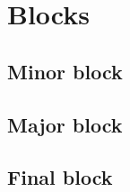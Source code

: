 \documentclass[../hydrozoa.tex]{subfiles}
\begin{document}
\section{Blocks}%
\label{h:offchain-blocks}


\subsection{Minor block}%
\label{h:minor-block}




\subsection{Major block}%
\label{h:major-block}




\subsection{Final block}%
\label{h:final-block}



\end{document}
